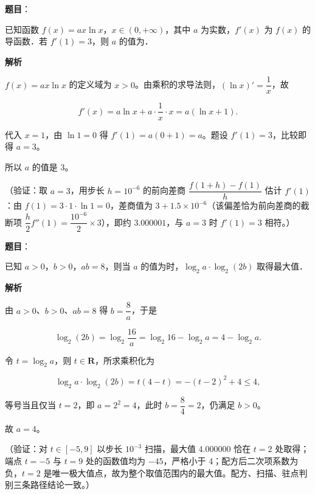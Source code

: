 \begin{answer}

\textbf{题目}：

已知函数 \(f(x)=ax\ln x\)，\(x\in(0,+\infty)\)，其中 \(a\) 为实数，\(f'(x)\) 为 \(f(x)\) 的导函数．若 \(f'(1)=3\)，则 \(a\) 的值为\gkblank{}．

\textbf{解析}

\(f(x)=ax\ln x\) 的定义域为 \(x>0\)。由乘积的求导法则，\((\ln x)'=\dfrac1x\)，故

\nopagebreak[4]
\[
f'(x)=a\ln x+a\cdot\dfrac1x\cdot x=a(\ln x+1).
\]

代入 \(x=1\)，由 \(\ln 1=0\) 得 \(f'(1)=a(0+1)=a\)。题设 \(f'(1)=3\)，比较即得 \(a=3\)。

所以 \(a\) 的值是 \(3\)。

（验证：取 \(a=3\)，用步长 \(h=10^{-6}\) 的前向差商 \(\dfrac{f(1+h)-f(1)}{h}\) 估计 \(f'(1)\)：由 \(f(1)=3\cdot1\cdot\ln1=0\)，差商值为 \(3+1.5\times10^{-6}\)（该偏差恰为前向差商的截断项 \(\dfrac h2 f''(1)=\dfrac{10^{-6}}{2}\times3\)），即约 \(3.000001\)，与 \(a=3\) 时 \(f'(1)=3\) 相符。）


\end{answer}
\begin{answer}

\textbf{题目}：

已知 \(a>0\)，\(b>0\)，\(ab=8\)，则当 \(a\) 的值为\gkblank{}时，\(\log_2 a\cdot\log_2(2b)\) 取得最大值．

\textbf{解析}

由 \(a>0\)、\(b>0\)、\(ab=8\) 得 \(b=\dfrac8a\)，于是

\nopagebreak[4]
\[
\log_2(2b)=\log_2\dfrac{16}{a}=\log_2 16-\log_2 a=4-\log_2 a.
\]

令 \(t=\log_2 a\)，则 \(t\in\mathbf{R}\)，所求乘积化为

\nopagebreak[4]
\[
\log_2 a\cdot\log_2(2b)=t(4-t)=-(t-2)^{2}+4\leqslant 4,
\]

等号当且仅当 \(t=2\)，即 \(a=2^{2}=4\)，此时 \(b=\dfrac84=2\)，仍满足 \(b>0\)。

故 \(a=4\)。

（验证：对 \(t\in[-5,9]\) 以步长 \(10^{-3}\) 扫描，最大值 \(4.000000\) 恰在 \(t=2\) 处取得；端点 \(t=-5\) 与 \(t=9\) 处的函数值均为 \(-45\)，严格小于 4；配方后二次项系数为负，\(t=2\) 是唯一极大值点，故为整个取值范围内的最大值。配方、扫描、驻点判别三条路径结论一致。）


\end{answer}
